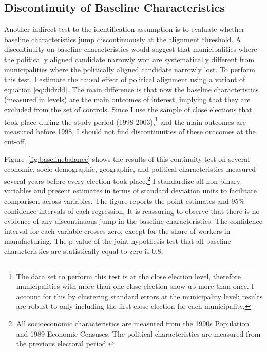 \documentclass[dv_diss_main.tex]{subfiles}
\begin{document}

\subsection{Discontinuity of Baseline Characteristics} Another indirect test to the identification assumption is to evaluate whether baseline characteristics jump discontinuously at the alignment threshold. A discontinuity on baseline characteristics would suggest that municipalities where the politically aligned candidate narrowly won are systematically different from municipalities where the politically aligned candidate narrowly lost.
To perform this test, I estimate the causal effect of political alignment using a variant of equation \eqref{eq:didrdd}.  The main difference is that now the baseline characteristics (measured in levels) are the main outcomes of interest, implying that they are excluded from the set of controls. Since I use the sample of close elections that took place during the study period (1998-2003),\footnote{The data set to perform this test is at the close election level, therefore municipalities with more than one close election show up more than once. I account for this by clustering standard errors at the municipality level; results are robust to only including the first close election for each municipality.} and the main outcomes are measured before 1998, I should not find discontinuities of these outcomes at the cut-off.

Figure~\ref{fig:baselinebalance} shows the results of this continuity test on several economic, socio-demographic, geographic, and political characteristics measured several years before every election took place.\footnote{All socioeconomic characteristics are measured from the 1990s Population and 1989 Economic Censuses. The political characteristics are measured from the previous electoral period.} 
I standardize all non-binary variables and present estimates in terms of standard deviation units to facilitate comparison across variables. The figure reports the point estimates and 95\% confidence intervals of each regression.
It is reassuring to observe that there is no evidence of any discontinuous jump in the baseline characteristics. The confidence interval for each variable crosses zero, except for the share of workers in manufacturing. The p-value of the joint hypothesis test that all baseline characteristics are statistically equal to zero is 0.8. 
\end{document}
